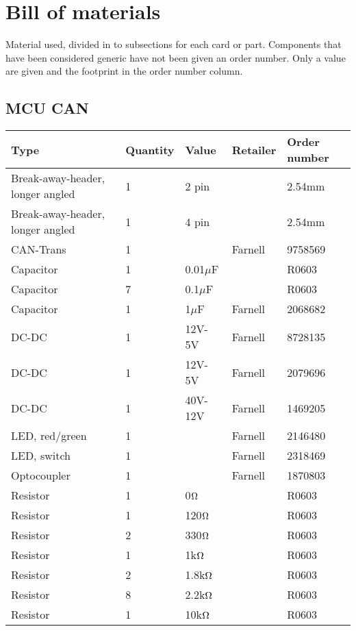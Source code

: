 \section{Bill of materials}
\label{Bill of material}
Material used, divided in to subsections for each card or part. Components that have been considered generic have not been given an order number. Only a value are given and the footprint in the order number column.
 
\subsection{MCU CAN}
\begin{center}
\begin{tabularx}{\textwidth}{|X|l|l|l|l|}
\hline
\textbf{Type} & \textbf{Quantity} & \textbf{Value} & \textbf{Retailer} & \textbf{Order number} \\ \hline
Break-away-header, longer angled & 1 & 2 pin & & 2.54mm \\ \hline
Break-away-header, longer angled & 1 & 4 pin & & 2.54mm\\ \hline
CAN-Trans & 1 & & Farnell & 9758569	\\ \hline
Capacitor & 1 & 0.01$\mu$F & & R0603 \\ \hline
Capacitor & 7 & 0.1$\mu$F & & R0603 \\ \hline
Capacitor & 1 & 1$\mu$F & Farnell & 2068682 \\ \hline
DC-DC & 1 & 12V-5V & Farnell & 8728135	\\ \hline
DC-DC & 1 & 12V-5V & Farnell & 2079696 \\ \hline
DC-DC & 1 & 40V-12V & Farnell & 1469205 \\ \hline
LED, red/green & 1 & & Farnell & 2146480 \\ \hline
LED, switch	& 1	& & Farnell & 2318469 \\ \hline
Optocoupler & 1 & & Farnell	& 1870803 \\ \hline
Resistor & 1 & 0$\ohm$ & & R0603 \\ \hline
Resistor & 1 & 120$\ohm$& & R0603 \\ \hline
Resistor & 2 & 330$\ohm$& & R0603 \\ \hline
Resistor & 1 & 1k$\ohm$& & R0603 \\ \hline
Resistor & 2 & 1.8k$\ohm$& & R0603 \\ \hline
Resistor & 8 & 2.2k$\ohm$& & R0603 \\ \hline
Resistor & 1 & 10k$\ohm$&	& R0603	\\ \hline

\end{tabularx}
\end{center}

